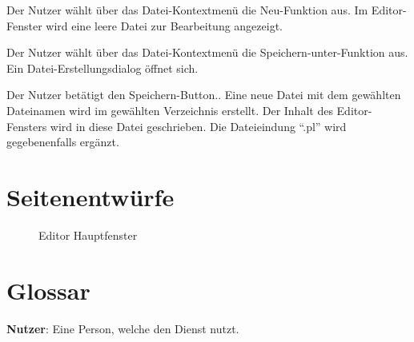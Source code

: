 \documentclass[parskip=full,11pt,twoside]{scrartcl}
\begin{document}
{Der Nutzer wählt über das Datei-Kontextmenü die Neu-Funktion aus.}
{Im Editor-Fenster wird eine leere Datei zur Bearbeitung angezeigt.}

{Der Nutzer wählt über das Datei-Kontextmenü die Speichern-unter-Funktion aus.}
{Ein Datei-Erstellungsdialog öffnet sich.}

{Der Nutzer betätigt den Speichern-Button..}
{Eine neue Datei mit dem gewählten Dateinamen wird im gewählten Verzeichnis erstellt. Der Inhalt des Editor-Fensters wird in diese Datei geschrieben. Die Dateieindung \enquote{.pl} wird gegebenenfalls ergänzt.}

\pagebreak
\appendix

\section{Seitenentwürfe}

\begin{figure}[hb]
\caption{\label{fig:editor}
Editor Hauptfenster
}
\end{figure}

\section{Glossar}

\textbf{Nutzer}:
Eine Person, welche den Dienst nutzt.
\end{document}
